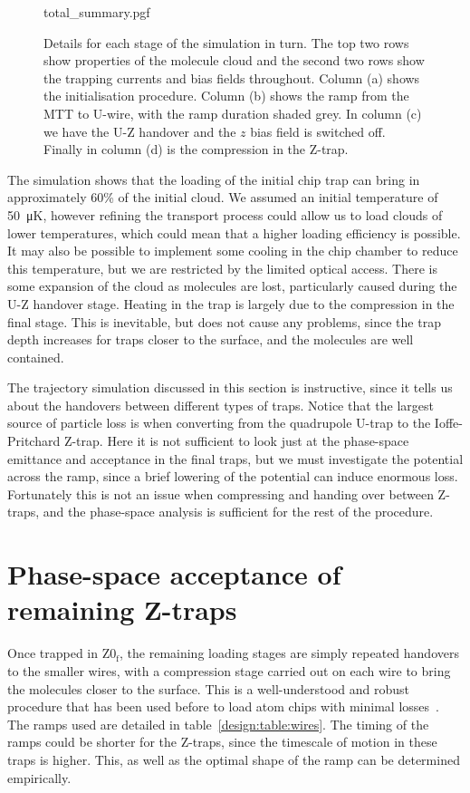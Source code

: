\begin{figure}[p]
\centering
  {total_summary.pgf}
  \caption{
    Details for each stage of the simulation in turn. The top two rows show
    properties of the molecule cloud and the second two rows show the trapping
    currents and bias fields throughout. Column (a) shows the initialisation
    procedure. Column (b) shows the ramp from the MTT to U-wire, with the ramp
    duration shaded grey.  In column (c) we have the U-Z handover and the $z$
    bias field is switched off. Finally in column (d) is the compression in the
    Z-trap.
  }
  \label{design:fig:simsum}
\end{figure}

The simulation shows that the loading of the initial chip trap can bring in
approximately 60\% of the initial cloud. We assumed an initial temperature of
\SI{50}{\micro\kelvin}, however refining the transport process could allow us
to load clouds of lower temperatures, which could mean that a higher loading
efficiency is possible. It may also be possible to implement some cooling in
the chip chamber to reduce this temperature, but we are restricted by the
limited optical access.
%
There is some expansion of the cloud as molecules are lost, particularly caused
during the U-Z handover stage.
%
Heating in the trap is largely due to the compression in the final stage. This
is inevitable, but does not cause any problems, since the trap depth
increases for traps closer to the surface, and the molecules are
well contained.

The trajectory simulation discussed in this section is instructive, since it
tells us about the handovers between different types of traps. Notice
that the largest source of particle loss is when converting from the quadrupole
U-trap to the Ioffe-Pritchard Z-trap. Here it is not sufficient to look just at
the phase-space emittance and acceptance in the final traps, but we must
investigate the potential across the ramp, since a brief lowering of the
potential can induce enormous loss. Fortunately this is not an issue when
compressing and handing over between Z-traps, and the phase-space analysis is
sufficient for the rest of the procedure.

\section{Phase-space acceptance of remaining Z-traps}
\label{design:transferbetweenzs}

Once trapped in $\mathrm{Z0_f}$, the remaining loading stages are simply
repeated handovers to the smaller wires, with a compression stage carried out
on each wire to bring the molecules closer to the surface. This is a
well-understood and robust procedure that has been used before to load atom
chips with minimal losses~\cite{Reichel2002}. The ramps used are detailed in
table~\ref{design:table:wires}.  The timing of the ramps could be shorter for
the Z-traps, since the timescale of motion in these traps is higher. This, as
well as the optimal shape of the ramp can be determined empirically.

